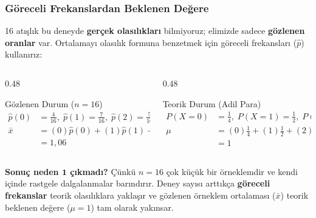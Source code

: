 ﻿\documentclass[light]{lutbeamer}
\begin{document}
\begin{frame}[fragile]
  \frametitle[Göreceli Frekanslar]{Göreceli Frekanslardan Beklenen Değere}

  \justifying{}
  \small
  16 atışlık bu deneyde \textbf{gerçek olasılıkları} bilmiyoruz; elimizde sadece \textbf{gözlenen oranlar} var. Ortalamayı olasılık formuna benzetmek için göreceli frekansları ($\hat{p}$) kullanırız:

  \vspace{0.5em}
  \begin{columns}[T]
    \begin{column}{0.48\textwidth}
      \begin{block}{Gözlenen Durum ($n=16$)}
        \vspace{-1em}
        {\footnotesize
        \begin{align*}
          \hat{p}(0) &= \frac{4}{16},\; \hat{p}(1) = \frac{7}{16},\; \hat{p}(2) = \frac{5}{16} \\[0.5em]
          \bar{x} &= (0)\hat{p}(0) + (1)\hat{p}(1) + (2)\hat{p}(2) \\
                  &= 1{,}06
        \end{align*}
        }
      \end{block}
    \end{column}
    \begin{column}{0.48\textwidth}
      \begin{exampleblock}{Teorik Durum (Adil Para)}
        \vspace{-1em}
        {\footnotesize
        \begin{align*}
          P(X=0) &= \frac{1}{4},\; P(X=1) = \frac{1}{2},\; P(X=2) = \frac{1}{4} \\[0.5em]
          \mu &= (0)\frac{1}{4} + (1)\frac{1}{2} + (2)\frac{1}{4} \\
              &= 1
        \end{align*}
        }
      \end{exampleblock}
    \end{column}
  \end{columns}

  \vspace{0.5em}
  \begin{center}
    \begin{minipage}{0.98\textwidth}
      \footnotesize
      \textbf{Sonuç neden $\mathbf{1}$ çıkmadı?} Çünkü $n=16$ çok küçük bir örneklemdir ve kendi içinde rastgele dalgalanmalar barındırır. Deney sayısı arttıkça \textbf{göreceli frekanslar} teorik olasılıklara yaklaşır ve gözlenen örneklem ortalaması ($\bar{x}$) teorik beklenen değere ($\mu=1$) tam olarak yakınsar.
    \end{minipage}
  \end{center}
\end{frame}
\end{document}
